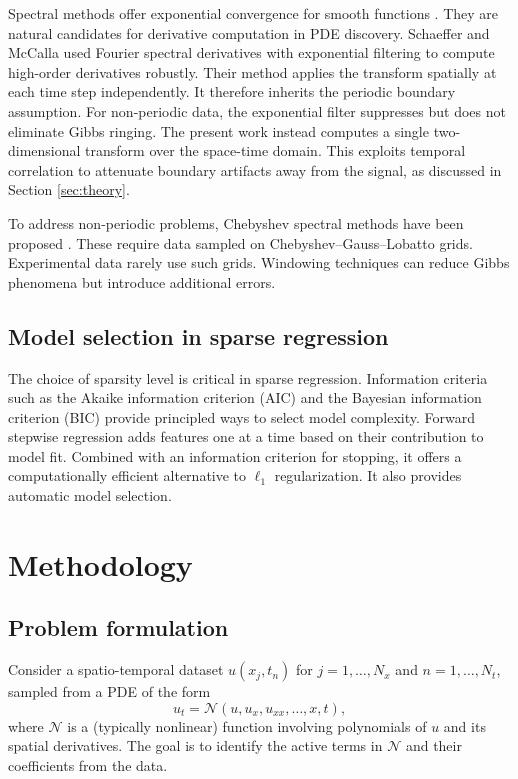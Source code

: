 \documentclass[preprint,12pt]{elsarticle}
\begin{document}
Spectral methods offer exponential convergence for smooth functions \cite{canuto2006spectral}. They are natural candidates for derivative computation in PDE discovery. Schaeffer and McCalla \cite{schaeffer2017learning} used Fourier spectral derivatives with exponential filtering to compute high-order derivatives robustly. Their method applies the transform spatially at each time step independently. It therefore inherits the periodic boundary assumption. For non-periodic data, the exponential filter suppresses but does not eliminate Gibbs ringing. The present work instead computes a single two-dimensional transform over the space-time domain. This exploits temporal correlation to attenuate boundary artifacts away from the signal, as discussed in Section \ref{sec:theory}.

To address non-periodic problems, Chebyshev spectral methods have been proposed \cite{kopriva2009implementing}. These require data sampled on Chebyshev--Gauss--Lobatto grids. Experimental data rarely use such grids. Windowing techniques can reduce Gibbs phenomena but introduce additional errors.

\subsection{Model selection in sparse regression}

The choice of sparsity level is critical in sparse regression. Information criteria such as the Akaike information criterion (AIC) and the Bayesian information criterion (BIC) \cite{schwarz1978estimating} provide principled ways to select model complexity. Forward stepwise regression adds features one at a time based on their contribution to model fit. Combined with an information criterion for stopping, it offers a computationally efficient alternative to $\ell_1$ regularization. It also provides automatic model selection.

\section{Methodology}
\label{sec:method}

\subsection{Problem formulation}

Consider a spatio-temporal dataset $u(x_j, t_n)$ for $j = 1, \ldots, N_x$ and $n = 1, \ldots, N_t$, sampled from a PDE of the form
\begin{equation}
u_t = \mathcal{N}(u, u_x, u_{xx}, \ldots, x, t),
\end{equation}
where $\mathcal{N}$ is a (typically nonlinear) function involving polynomials of $u$ and its spatial derivatives. The goal is to identify the active terms in $\mathcal{N}$ and their coefficients from the data.
\end{document}
